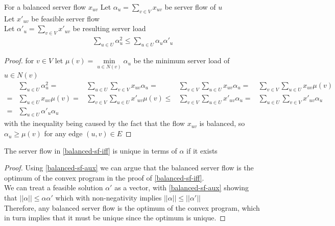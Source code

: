 \begin{lemma}
	\label{balanced-sf-aux}
	For a balanced server flow $x_{uv}$
	Let $\alpha_u=\sum\limits_{v\in V}x_{uv}$ be server flow of $u$\\
	Let $x'_{uv}$ be feasible server flow\\
	Let $\alpha'_u=\sum\limits_{v\in V}x'_{uv}$ be resulting server load\\
	\begin{align*}
		\sum\limits_{u\in U}\alpha_u^2\leq\sum\limits_{u\in U}\alpha_u\alpha'_u
	\end{align*}
\end{lemma}
\begin{proof}
	for $v\in V$ let $\mu(v)=\underset{u\in N(v)}{\min}\alpha_u$ be the minimum server load of $u\in N(v)$
	\begin{align*}
		    &\sum\limits_{u\in U}\alpha_u^2
		   =&\sum\limits_{u\in U}\sum\limits_{v\in V}x_{uv}\alpha_u
		   =&\sum\limits_{v\in V}\sum\limits_{u\in U}x_{uv}\alpha_u
		   =&\sum\limits_{v\in V}\sum\limits_{u\in U}x_{uv}\mu(v)\\
		   =&\sum\limits_{u\in U}x_{uv}\mu(v)
		   =&\sum\limits_{v\in V}\sum\limits_{u\in U}x'_{uv}\mu(v)
		\leq&\sum\limits_{v\in V}\sum\limits_{u\in U}x'_{uv}\alpha_u
		   =&\sum\limits_{u\in U}\sum\limits_{v\in V}x'_{uv}\alpha_u\\
		   =&\sum\limits_{u\in U}\alpha'_u\alpha_u
	\end{align*}
	with the inequality being caused by the fact that the flow $x_{uv}$ is balanced, so $\alpha_u\geq\mu(v)$ for any edge $(u,v)\in E$
\end{proof}

\begin{lemma}
	\label{balanced-sf-unique}
	The server flow in \autoref{balanced-sf-iff} is unique in terms of $\alpha$ if it exists
\end{lemma}
\begin{proof}
	Using \autoref{balanced-sf-aux} we can argue that the balanced server flow is the optimum of the convex program in the proof of \autoref{balanced-sf-iff}.\\
	We can treat a feasible solution $\alpha'$ as a vector, with \autoref{balanced-sf-aux} showing that $||\alpha||\leq \alpha\alpha'$ which with non-negativity implies $||\alpha||\leq||\alpha'||$\\
	Therefore, any balanced server flow is the optimum of the convex program, which in turn implies that it must be unique since the optimum is unique.
\end{proof}

